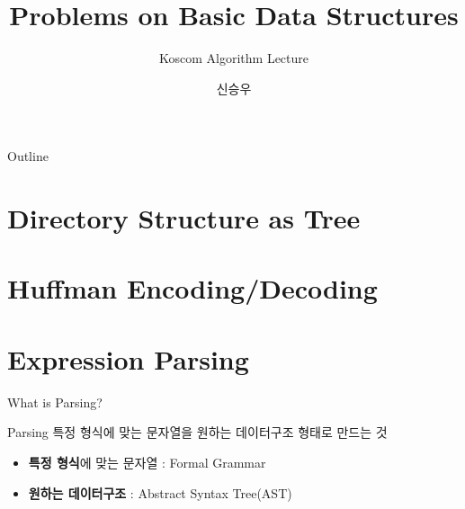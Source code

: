 \documentclass{beamer}
\title{Problems on Basic Data Structures}
\subtitle{Koscom Algorithm Lecture}
\author{신승우}
\begin{document}
\begin{frame}
  \titlepage
\end{frame}

\begin{frame}{Outline}
  \tableofcontents
\end{frame}



\section{Directory Structure as Tree} 



\section{Huffman Encoding/Decoding} 








\section{Expression Parsing}
\begin{frame}{What is Parsing?} 
\begin{block}{Parsing} 
특정 형식에 맞는 문자열을 원하는 데이터구조 형태로 만드는 것
\end{block}
\begin{itemize} 
\item \textbf{특정 형식}에 맞는 문자열 : Formal Grammar 
\item \textbf{원하는 데이터구조} : Abstract Syntax Tree(AST)
\end{itemize}
\end{frame}
\end{document}
